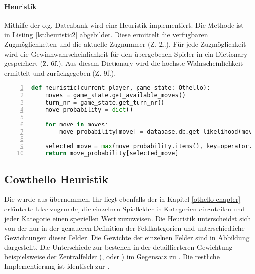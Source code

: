 \paragraph{Heuristik}
\label{para:heuristic1}
Mithilfe der o.g. Datenbank wird eine Heuristik implementiert. Die Methode  ist in Listing \ref{lst:heuristic2} abgebildet. Diese ermittelt die verfügbaren Zugmöglichkeiten und die aktuelle Zugnummer (Z. 2f.). Für jede Zugmöglichkeit wird die Gewinnwahrscheinlichkeit für den übergebenen Spieler in ein Dictionary gespeichert (Z. 6f.). Aus diesem Dictionary wird die höchste Wahrscheinlichkeit ermittelt und zurückgegeben (Z. 9f.).
\begin{lstlisting}[caption = {Stored Monte-Carlo-Heuristik Funktion}, language = python, captionpos = t , numbers=left, label={lst:heuristic2}]
def heuristic(current_player, game_state: Othello):
	moves = game_state.get_available_moves()
	turn_nr = game_state.get_turn_nr()
	move_probability = dict()

	for move in moves:
		move_probability[move] = database.db.get_likelihood(move, turn_nr, current_player)

	selected_move = max(move_probability.items(), key=operator.itemgetter(1))[0]
 	return move_probability[selected_move]
\end{lstlisting}

\subsection{Cowthello Heuristik}
Die  wurde aus \cite{cow1} übernommen. Ihr liegt ebenfalls der in Kapitel \ref{othello-chapter} erläuterte Idee zugrunde, die einzelnen Spielfelder in Kategorien einzuteilen und jeder Kategorie einen speziellen Wert zuzuweisen. Die Heuristik unterscheidet sich von der  nur in der genaueren Definition der Feldkategorien und unterschiedliche Gewichtungen dieser Felder.
Die Gewichte der einzelnen Felder sind in Abbildung dargestellt. Die Unterschiede zur  bestehen in der detaillierteren Gewichtung beispielsweise der Zentralfelder (,  oder ) im Gegensatz zu . Die restliche Implementierung ist identisch zur .
\\

